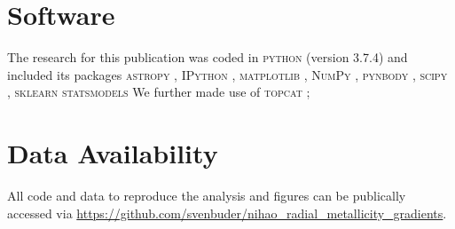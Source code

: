 \documentclass[fleqn,usenatbib]{mnras}
\begin{document}
\section*{Software}

The research for this publication was coded in \textsc{python} (version 3.7.4) and included its packages
\textsc{astropy} \citep[v. 3.2.2;][]{Robitaille2013,PriceWhelan2018},
\textsc{IPython} \citep[v. 7.8.0;][]{ipython},
\textsc{matplotlib} \citep[v. 3.1.3;][]{matplotlib},
\textsc{NumPy} \citep[v. 1.17.2;][]{numpy},
\textsc{pynbody} \citep[v. 1.1.0;][]{pynbody},
\textsc{scipy} \citep[v. 1.3.1;][]{Scipy},
\textsc{sklearn} \citep[v. 1.5.1][]{scikit-learn}
\textsc{statsmodels} \citep[v. 0.14.2][]{statsmodels}
We further made use of \textsc{topcat} \citep[version 4.7;][]{Taylor2005};

\section*{Data Availability}

All code and data to reproduce the analysis and figures can be publically accessed via \url{https://github.com/svenbuder/nihao_radial_metallicity_gradients}.





\end{document}
